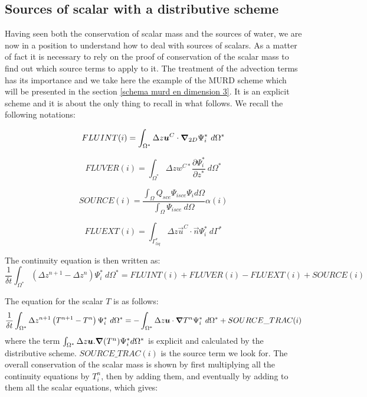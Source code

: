 \subsection{\label{sourcesdistributive}Sources of scalar with a distributive scheme}

Having seen both the conservation of scalar mass
and the sources of water, we
are now in a position to understand how to
deal with sources of scalars. As a
matter of fact it is necessary to rely on the
proof of conservation of the
scalar mass to find out which source terms to apply to it.
The treatment of the advection terms has its importance
and we take here the example of the MURD
scheme which will be presented in the section
\ref{schema murd en dimension 3}. It
is an explicit scheme and it is about the only thing to recall in what
follows. We recall the following notations:

\begin{equation}
FLUINT(i)=\int_{\Omega^{\ast}}\Delta z\bm{u}^C\cdot\bm{\nabla}_{2D}\Psi_{i}^{\ast}
~d\Omega^{\ast}
\end{equation}

\begin{equation}
FLUVER(i)=\int_{\Omega^{\ast}}\Delta zw^{C\ast}\dfrac{\partial\Psi_{i}^{\ast}
}{\partial z^{\ast}}~d\Omega^{\ast}
\end{equation}

\begin{equation}
SOURCE(i)=\dfrac{\int\nolimits_{\Omega}Q_{sce}\Psi_{isce}\Psi_{i}d\Omega}
{\int_{\Omega}\Psi_{isce}~d\Omega}\alpha(i)
\end{equation}

\begin{equation}
FLUEXT(i)=\int_{\Gamma_{liq}^{\ast}}\Delta z\vec{u}^C\cdot\vec{n}
\Psi_{i}^{\ast}~d\Gamma^{\ast}
\end{equation}

\bigskip The continuity equation is then written as:
\begin{equation}
\dfrac{1}{\delta t}\int_{\Omega^{\ast}}\left(\Delta z^{n+1}-\Delta z^{n}
\right)\Psi_{i}^{\ast}~d\Omega^{\ast}=FLUINT(i)+FLUVER(i)-FLUEXT(i)+SOURCE(i)
\end{equation}


The equation for the scalar $T$ is as follows:%
\begin{equation}
\dfrac{1}{\delta t}\int_{\Omega^{\ast}}\Delta z^{n+1}
\left(T^{n+1}-T^{n}\right)  \Psi_{i}^{\ast}~d\Omega^{\ast}=
-\int_{\Omega^{\ast}}\Delta z\bm{u}\cdot\bm{\nabla} T^{n}\Psi_{i}^{\ast}~d\Omega^{\ast}+SOURCE\_TRAC(i)
\end{equation}
where the term $\int_{\Omega^{\ast}}\Delta z\vec{u}%
.\Grad(T^{n})\Psi_{i}^{\ast}d\Omega^{\ast}$ is explicit and
calculated by the distributive scheme.
$SOURCE\_TRAC(i)$ is the source term we look for.
The overall conservation of the scalar mass is shown by
first multiplying all the continuity equations by
$T_{i}^{n}$, then by adding them, and eventually by adding to
them all the scalar equations, which gives:

